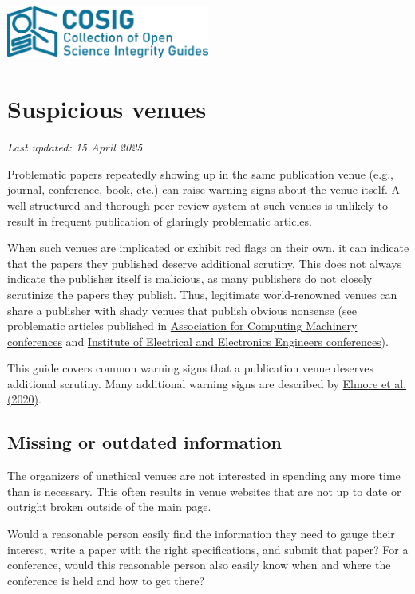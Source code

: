\documentclass[letterpaper, 12pt]{article}
\begin{document}
\flushleft
\includegraphics[width=0.5\textwidth]{img/home/241017_final_logo_mockup.png}

\section*{Suspicious venues}
\textit{Last updated: 15 April 2025}

Problematic papers repeatedly showing up in the same publication venue (e.g., journal, conference, book, etc.) can raise warning signs about the venue itself. A well-structured and thorough peer review system at such venues is unlikely to result in frequent publication of glaringly problematic articles.

When such venues are implicated or exhibit red flags on their own, it can indicate that the papers they published deserve additional scrutiny.
This does not always indicate the publisher itself is malicious, as many publishers do not closely scrutinize the papers they publish.
Thus, legitimate world-renowned venues can share a publisher with shady venues that publish obvious nonsense (see problematic articles published in \href{https://solalpirelli.github.io/2023/01/25/troubling-acm-venues.html}{Association for Computing Machinery conferences} and \href{https://deevybee.blogspot.com/2025/02/ieee-has-pseudoscience-problem.html}{Institute of Electrical and Electronics Engineers conferences}).

This guide covers common warning signs that a publication venue deserves additional scrutiny. Many additional warning signs are described by \href{https://doi.org/10.1177/0192623320920209}{Elmore et al. (2020)}.

\subsection*{Missing or outdated information}

The organizers of unethical venues are not interested in spending any more time than is necessary.
This often results in venue websites that are not up to date or outright broken outside of the main page.

Would a reasonable person easily find the information they need to gauge their interest,
write a paper with the right specifications, and submit that paper?
For a conference, would this reasonable person also easily know when and where the conference is held and how to get there?
\end{document}
